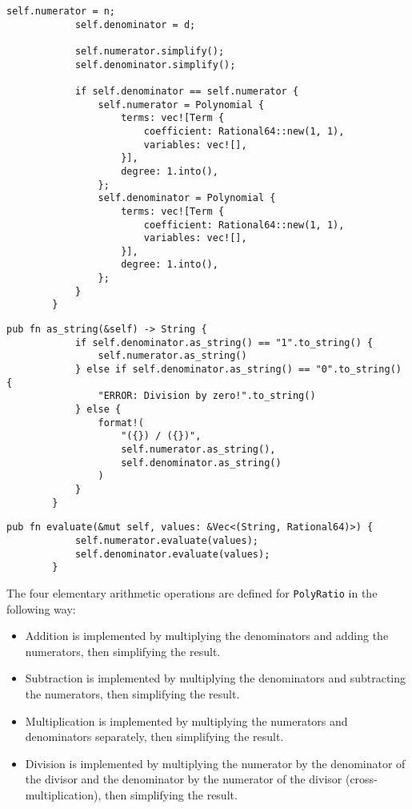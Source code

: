 \begin{lstlisting}[caption={The implementation of the \texttt{simplify()} method for the \texttt{PolyRatio} struct}, label={lst:polyratio-simplify}]
            self.numerator = n;
            self.denominator = d;
    
            self.numerator.simplify();
            self.denominator.simplify();
    
            if self.denominator == self.numerator {
                self.numerator = Polynomial {
                    terms: vec![Term {
                        coefficient: Rational64::new(1, 1),
                        variables: vec![],
                    }],
                    degree: 1.into(),
                };
                self.denominator = Polynomial {
                    terms: vec![Term {
                        coefficient: Rational64::new(1, 1),
                        variables: vec![],
                    }],
                    degree: 1.into(),
                };
            }
        }
    \end{lstlisting}

    \begin{lstlisting}[caption={The implementation of the \texttt{as\_string()} method for the \texttt{PolyRatio} struct}, label={lst:polyratio-as-string}]
        pub fn as_string(&self) -> String {
            if self.denominator.as_string() == "1".to_string() {
                self.numerator.as_string()
            } else if self.denominator.as_string() == "0".to_string() {
                "ERROR: Division by zero!".to_string()
            } else {
                format!(
                    "({}) / ({})",
                    self.numerator.as_string(),
                    self.denominator.as_string()
                )
            }
        }
    \end{lstlisting}

    \begin{lstlisting}[caption={The implementation of the \texttt{evaluate()} method for the \texttt{PolyRatio} struct}, label={lst:polyratio-evaluate}]
        pub fn evaluate(&mut self, values: &Vec<(String, Rational64)>) {
            self.numerator.evaluate(values);
            self.denominator.evaluate(values);
        }
    \end{lstlisting}

The four elementary arithmetic operations are defined for \verb|PolyRatio| in the following way:
\begin{itemize}
    \item Addition is implemented by multiplying the denominators and adding the numerators, then simplifying the result.
    \item Subtraction is implemented by multiplying the denominators and subtracting the numerators, then simplifying the result.
    \item Multiplication is implemented by multiplying the numerators and denominators separately, then simplifying the result.
    \item Division is implemented by multiplying the numerator by the denominator of the divisor and the denominator by the numerator of the divisor (cross-multiplication), then simplifying the result. 
\end{itemize}

